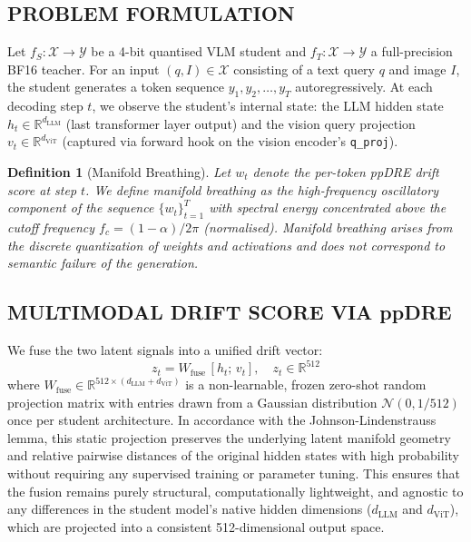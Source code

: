 \documentclass{ieeetmlcn}
\newtheorem{definition}{Definition}
\begin{document}
\subsection{PROBLEM FORMULATION}
Let $f_S : \mathcal{X} \to \mathcal{Y}$ be a 4-bit quantised VLM
student and $f_T : \mathcal{X} \to \mathcal{Y}$ a full-precision BF16
teacher. For an input $(q, I) \in \mathcal{X}$ consisting of a text
query $q$ and image $I$, the student generates a token sequence
$y_1, y_2, \ldots, y_T$ autoregressively. At each decoding step $t$, we
observe the student's internal state: the LLM hidden state
$h_t \in \mathbb{R}^{d_{\text{LLM}}}$ (last transformer layer output)
and the vision query projection $v_t \in \mathbb{R}^{d_{\text{ViT}}}$
(captured via forward hook on the vision encoder's \texttt{q\_proj}).

\begin{definition}[Manifold Breathing]
Let $w_t$ denote the per-token ppDRE drift score at step $t$. We define
\emph{manifold breathing} as the high-frequency oscillatory component of
the sequence $\{w_t\}_{t=1}^T$ with spectral energy concentrated above
the cutoff frequency $f_c = (1-\alpha)/2\pi$ (normalised). Manifold
breathing arises from the discrete quantization of weights and
activations and does not correspond to semantic failure of the
generation.
\end{definition}

\subsection{MULTIMODAL DRIFT SCORE VIA ppDRE}
We fuse the two latent signals into a unified drift vector:
\begin{equation}
  z_t = W_{\text{fuse}}\,[h_t;\, v_t], \quad z_t \in \mathbb{R}^{512}
  \label{eq:fusion}
\end{equation}
where $W_{\text{fuse}} \in \mathbb{R}^{512 \times (d_{\text{LLM}} + d_{\text{ViT}})}$ is a non-learnable, frozen zero-shot random projection matrix with entries drawn from a Gaussian distribution $\mathcal{N}(0, 1 / 512)$ once per student architecture. In accordance with the Johnson-Lindenstrauss lemma, this static projection preserves the underlying latent manifold geometry and relative pairwise distances of the original hidden states with high probability without requiring any supervised training or parameter tuning. This ensures that the fusion remains purely structural, computationally lightweight, and agnostic to any differences in the student model's native hidden dimensions ($d_{\text{LLM}}$ and $d_{\text{ViT}}$), which are projected into a consistent 512-dimensional output space.
\end{document}
